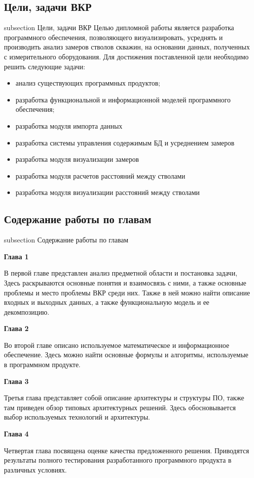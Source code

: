 \subsection*{Цели, задачи ВКР}
 {subsection} {Цели, задачи ВКР}
Целью дипломной работы является разработка программного обеспечения, позволяющего визуализировать, усреднять и производить анализ замеров стволов скважин,
на основании данных, полученных с измерительного оборудования. Для достижения поставленной цели необходимо решить следующие задачи:
\begin{itemize}
  \item анализ существующих программных продуктов;
  \item разработка функциональной и информационной моделей программного обеспечения;
  \item разработка модуля импорта данных
  \item разработка системы управления содержимым БД и усреднением замеров
  \item разработка модуля визуализации замеров
  \item разработка модуля расчетов расстояний между стволами
  \item разработка модуля визуализации расстояний между стволами
\end{itemize}

\subsection*{Содержание работы по главам}
 {subsection} {Содержание работы по главам}

\textbf{Глава 1}

В первой главе представлен анализ предметной области и постановка задачи, Здесь раскрываются основные понятия и взаимосвязь с ними,
а также основные проблемы и место проблемы ВКР среди них. Также в ней можно найти описание входных и выходных данных, а также функциональную модель и
ее декомпозицию.

\textbf{Глава 2}

Во второй главе описано используемое математическое и информационное обеспечение. Здесь можно найти основные формулы и алгоритмы, используемые в
программном продукте.

\textbf{Глава 3}

Третья глава представляет собой описание архитектуры и структуры ПО, также там приведен обзор типовых архитектурных решений. Здесь обосновывается выбор
используемых технологий и архитектуры.

\textbf{Глава 4}

Четвертая глава посвящена оценке качества предложенного решения. Приводятся результаты полного тестирования разработанного
программного продукта в различных условиях.
